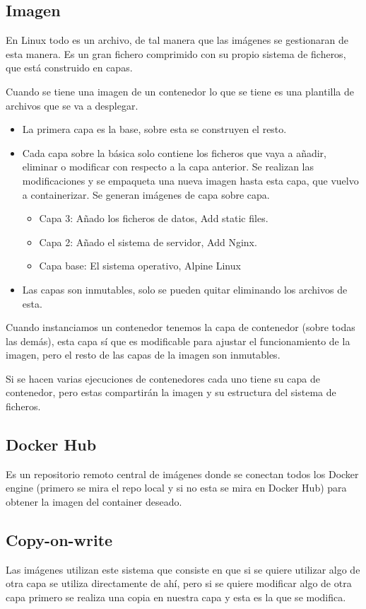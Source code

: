 \documentclass[12pt, twoside, openright]{report} %
\begin{document}
\subsection{Imagen}
En Linux todo es un archivo, de tal manera que las imágenes se gestionaran de esta manera. Es un gran fichero comprimido con su propio sistema de ficheros, que está construido en capas.

Cuando se tiene una imagen de un contenedor lo que se tiene es una plantilla de archivos que se va a desplegar.
\begin{itemize}
	\item La primera capa es la base, sobre esta se construyen el resto.
	\item Cada capa sobre la básica solo contiene los ficheros que vaya a añadir, eliminar o modificar con respecto a la capa anterior.
	      Se realizan las modificaciones y se empaqueta una nueva imagen hasta esta capa, que vuelvo a containerizar. Se generan imágenes de capa sobre capa.
	      \begin{itemize}
		      \item Capa 3: Añado los ficheros de datos, Add static files.
		      \item Capa 2: Añado el sistema de servidor, Add Nginx.
		      \item Capa base: El sistema operativo, Alpine Linux
	      \end{itemize}
	\item Las capas son inmutables, solo se pueden quitar eliminando los archivos de esta.
\end{itemize}


Cuando instanciamos un contenedor tenemos la capa de contenedor (sobre todas las demás), esta capa sí que es modificable para ajustar el funcionamiento de la imagen, pero el resto de las capas de la imagen son inmutables.

Si se hacen varias ejecuciones de contenedores cada uno tiene su capa de contenedor, pero estas compartirán la imagen y su estructura del sistema de ficheros.

\subsection{Docker Hub}
Es un repositorio remoto central de imágenes donde se conectan todos los Docker engine (primero se mira el repo local y si no esta se mira en Docker Hub) para obtener la imagen del container deseado.

\subsection{Copy-on-write}
Las imágenes utilizan este sistema que consiste en que si se quiere utilizar algo de otra capa se utiliza directamente de ahí, pero si se quiere modificar algo de otra capa primero se realiza una copia en nuestra capa y esta es la que se modifica.
\end{document}
